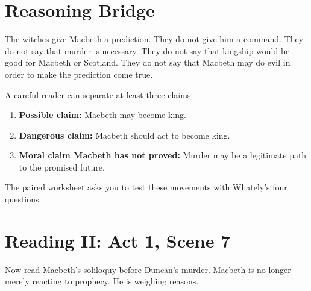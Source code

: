 \documentclass[12pt]{article}
\begin{document}
\section*{Reasoning Bridge}
The witches give Macbeth a prediction. They do not give him a command. They do not say that murder is necessary. They do not say that kingship would be good for Macbeth or Scotland. They do not say that Macbeth may do evil in order to make the prediction come true.

A careful reader can separate at least three claims:
\begin{enumerate}[leftmargin=*]
\item \textbf{Possible claim:} Macbeth may become king.
\item \textbf{Dangerous claim:} Macbeth should act to become king.
\item \textbf{Moral claim Macbeth has not proved:} Murder may be a legitimate path to the promised future.
\end{enumerate}
The paired worksheet asks you to test these movements with Whately's four questions.

\section*{Reading II: Act 1, Scene 7}
Now read Macbeth's soliloquy before Duncan's murder. Macbeth is no longer merely reacting to prophecy. He is weighing reasons.
\end{document}
